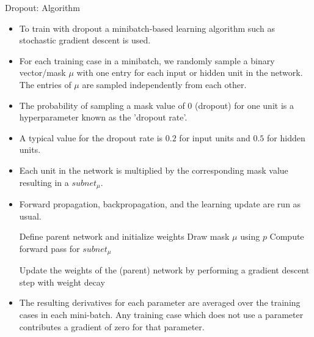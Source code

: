 \begin{vbframe}{Dropout: Algorithm}
\begin{itemize}
\item To train with dropout a minibatch-based learning algorithm such as stochastic gradient descent is used.  
\item For each training case in a minibatch, we randomly sample a binary vector/mask $\mu$ with one entry for each input or hidden unit in the network. The entries of $\mu$ are sampled independently from each other. 
\item The probability of sampling a mask value of 0 (dropout) for one unit is a hyperparameter known as the 'dropout rate'. 
\item A typical value for the dropout rate is $0.2$ for input units and $0.5$ for hidden units. 
\item Each unit in the network is multiplied by the corresponding mask value resulting in a $subnet_{\mu}$. 
\item Forward propagation, backpropagation, and the learning update are run as usual.

\framebreak


\begin{algorithm}[H]
\footnotesize
\caption{Training a (parent) neural network with dropout rate $p$}
\begin{algorithmic}[1]
\State Define parent network and initialize weights
\State Draw mask $\mu$ using $p$
  \State Compute forward pass for $subnet_{\mu}$
  \EndFor
\State \parbox[t]{\dimexpr\linewidth-\algorithmicindent}{Update the weights of the (parent) network by performing a gradient descent step with weight decay}
\EndFor
\end{algorithmic}
\end{algorithm}
\item The resulting derivatives for each parameter are averaged over the training cases in each mini-batch. Any training case which does not use a parameter contributes a gradient of zero for that parameter.
\end{itemize}
\end{vbframe}

